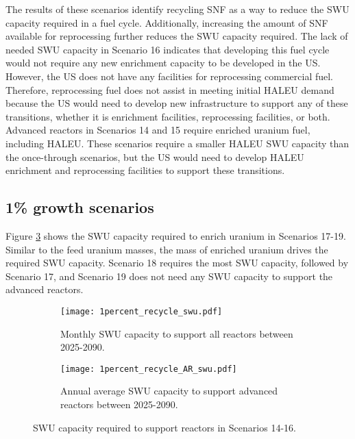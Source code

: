 The results of these scenarios identify recycling \gls{SNF} as a way 
to reduce the \gls{SWU} capacity required in a fuel cycle. Additionally, 
increasing the amount of \gls{SNF} available for reprocessing further 
reduces the \gls{SWU} capacity required. The lack of needed 
\gls{SWU} capacity in Scenario 16 indicates that developing this 
fuel cycle would not require any new enrichment capacity to be developed 
in the US.  However, the US does not have 
any facilities for reprocessing commercial fuel. Therefore, reprocessing
fuel does not assist in meeting initial \gls{HALEU} demand because 
the US would need to develop new infrastructure to support any 
of these transitions, whether it is enrichment facilities, 
reprocessing facilities, or both. Advanced reactors in Scenarios 14 and 15 
require enriched uranium fuel, including \gls{HALEU}. These scenarios 
require a smaller \gls{HALEU} \gls{SWU} capacity than the once-through 
scenarios, but the US would need to develop \gls{HALEU} enrichment 
and reprocessing facilities to support these transitions. 

\subsection{1\% growth scenarios}
Figure \ref{fig:1percent_recycle_swu} shows the \gls{SWU} capacity 
required to enrich uranium in Scenarios 17-19. Similar to the 
feed uranium masses, the mass of enriched uranium drives 
the required \gls{SWU} capacity. Scenario 18 requires the most 
\gls{SWU} capacity, followed by Scenario 17, and Scenario 19 does 
not need any \gls{SWU} capacity to support the advanced reactors. 

\begin{figure}[h!]
    \centering
    \begin{subfigure}[b]{0.45\textwidth}
        \centering
        \texttt{[image: 1percent\_recycle\_swu.pdf]}
        \caption{Monthly SWU capacity to support all reactors between 2025-2090.}
        \label{fig:1percent_recycle_swu_all}
    \end{subfigure}
    \hfill
    \begin{subfigure}[b]{0.45\textwidth}
        \centering
        \texttt{[image: 1percent\_recycle\_AR\_swu.pdf]}
        \caption{Annual average SWU capacity to support 
        advanced reactors between 2025-2090.}
        \label{fig:1percent_recycle_swu_AR}
    \end{subfigure}
       \caption{\gls{SWU} capacity required to support reactors in Scenarios 14-16.}
       \label{fig:1percent_recycle_swu}
\end{figure}

